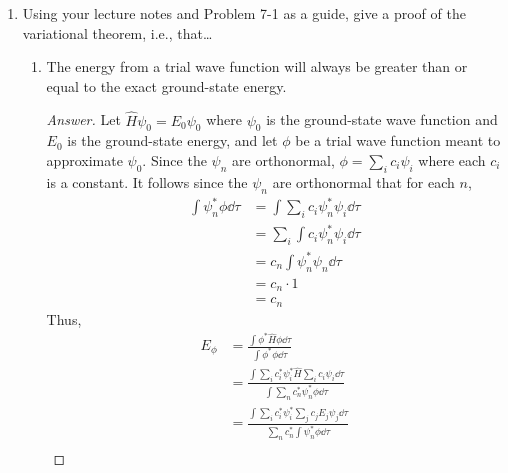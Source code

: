 \documentclass[../psets.tex]{subfiles}
\begin{document}
\begin{enumerate}
\begin{enumerate}
\begin{proof}[Answer]
\begin{center}
            \end{center}
            where the blue line corresponds to $R(r)$ and the red line corresponds to $R_{1s}(r)$. The probability densities follow the same general trend, but are normalized differently and peak at different places, meaning the electrons differ in terms of their most probable distance from the nucleus. In fact, the most probable distance from the nucleus for the planar atom is one-fourth the Bohr radius.
        \end{proof}
    \end{enumerate}
    \item Using your lecture notes and Problem 7-1 as a guide, give a proof of the variational theorem, i.e., that\dots
    \begin{enumerate}
        \item The energy from a trial wave function will always be greater than or equal to the exact ground-state energy.
        \begin{proof}[Answer]
            Let $\hat{H}\psi_0=E_0\psi_0$ where $\psi_0$ is the ground-state wave function and $E_0$ is the ground-state energy, and let $\phi$ be a trial wave function meant to approximate $\psi_0$. Since the $\psi_n$ are orthonormal,
            $\phi=\sum_ic_i\psi_i$ where each $c_i$ is a constant. It follows since the $\psi_n$ are orthonormal that for each $n$,
            \begin{align*}
                \int\psi_n^*\phi\dd{\tau} &= \int\sum_ic_i\psi_n^*\psi_i\dd{\tau}\\
                &= \sum_i\int c_i\psi_n^*\psi_i\dd{\tau}\\
                &= c_n\int\psi_n^*\psi_n\dd{\tau}\\
                &= c_n\cdot 1\\
                &= c_n
            \end{align*}
            Thus,
            \begin{align*}
                E_\phi &= \frac{\int\phi^*\hat{H}\phi\dd{\tau}}{\int\phi^*\phi\dd{\tau}}\\
                &= \frac{\int\sum_ic_i^*\psi_i^*\hat{H}\sum_ic_i\psi_i\dd{\tau}}{\int\sum_nc_n^*\psi_n^*\phi\dd{\tau}}\\
                &= \frac{\int\sum_ic_i^*\psi_i^*\sum_jc_jE_j\psi_j\dd{\tau}}{\sum_nc_n^*\int\psi_n^*\phi\dd{\tau}}\\

\end{align*}
\end{proof}
\end{enumerate}
\end{enumerate}
\end{document}

